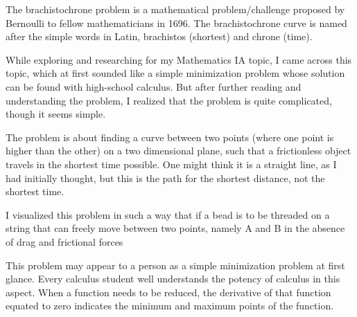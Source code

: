 



{The brachistochrone problem is a mathematical problem/challenge proposed by Bernoulli to fellow mathematicians in 1696. The brachistochrone curve is named after the simple words in Latin, brachistos (shortest) and chrone (time).}

{While exploring and researching for my Mathematics IA topic, I came across this topic, which at first sounded like a simple minimization problem whose solution can be found with high-school calculus. But after further reading and understanding the problem, I realized that the problem is quite complicated, though it seems simple.}

{The problem is about finding a curve between two points (where one point is higher than the other) on a two dimensional plane, such that a frictionless object travels in the shortest time possible. One might think it is a straight line, as I had initially thought, but this is the path for the shortest distance, not the shortest time.}

{I visualized this problem in such a way that if a bead is to be threaded on a string that can freely move between two points, namely A and B in the absence of drag and frictional forces}

{This problem may appear to a person as a simple minimization problem at first glance. Every calculus student well understands the potency of calculus in this aspect. When a function needs to be reduced, the derivative of that function equated to zero indicates the minimum and maximum points of the function.}

